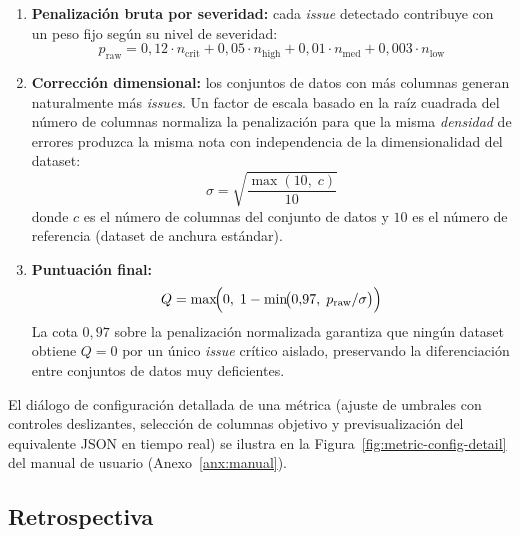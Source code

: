 \begin{enumerate}
  \item \textbf{Penalización bruta por severidad:}  cada \emph{issue}
    detectado contribuye con un peso fijo según su nivel de severidad:
    \[
      p_{\mathrm{raw}} =
        0{,}12\cdot n_{\mathrm{crit}}
      + 0{,}05\cdot n_{\mathrm{high}}
      + 0{,}01\cdot n_{\mathrm{med}}
      + 0{,}003\cdot n_{\mathrm{low}}
    \]

  \item \textbf{Corrección dimensional:}  los conjuntos de datos con más
    columnas generan naturalmente más \emph{issues}.  Un factor de escala
    basado en la raíz cuadrada del número de columnas normaliza la
    penalización para que la misma \emph{densidad} de errores produzca la
    misma nota con independencia de la dimensionalidad del dataset:
    \[
      \sigma = \sqrt{\frac{\max(10,\; c)}{10}}
    \]
    donde $c$ es el número de columnas del conjunto de datos y $10$ es el
    número de referencia (dataset de anchura estándar).

  \item \textbf{Puntuación final:}
    \[
      Q = \max\!\Bigl(0,\;1 - \min\!\bigl(0{,}97,\; p_{\mathrm{raw}} / \sigma\bigr)\Bigr)
    \]
    La cota $0{,}97$ sobre la penalización normalizada garantiza que ningún
    dataset obtiene $Q=0$ por un único \emph{issue} crítico aislado,
    preservando la diferenciación entre conjuntos de datos muy deficientes.
\end{enumerate}

El diálogo de configuración detallada de una métrica (ajuste de umbrales con
controles deslizantes, selección de columnas objetivo y previsualización del
equivalente \acs{JSON} en tiempo real) se ilustra en la
Figura~\ref{fig:metric-config-detail} del manual de usuario
(Anexo~\ref{anx:manual}).

\subsection{Retrospectiva}

